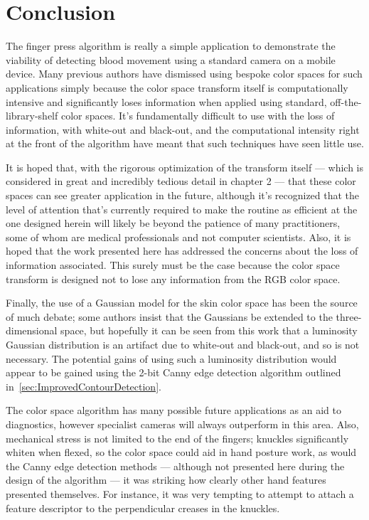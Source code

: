 \section{Conclusion}\label{sec:ConclusionCh5}

The finger press algorithm is really a simple application to demonstrate the viability of detecting blood movement using a standard camera on a mobile device. Many previous authors have dismissed using bespoke color spaces for such applications simply because the color space transform itself is computationally intensive and significantly loses information when applied using standard, off-the-library-shelf color spaces. It's fundamentally difficult to use with the loss of information, with white-out and black-out, and the computational intensity right at the front of the algorithm have meant that such techniques have seen little use.

It is hoped that, with the rigorous optimization of the transform itself --- which is considered in great and incredibly tedious detail in chapter 2 --- that these color spaces can see greater application in the future, although it's recognized that the level of attention that's currently required to make the routine as efficient at the one designed herein will likely be beyond the patience of many practitioners, some of whom are medical professionals and not computer scientists. Also, it is hoped that the work presented here has addressed the concerns about the loss of information associated. This surely must be the case because the color space transform is designed not to lose any information from the RGB color space.

Finally, the use of a Gaussian model for the skin color space has been the source of much debate; some authors insist that the Gaussians be extended to the three-dimensional space, but hopefully it can be seen from this work that a luminosity Gaussian distribution is an artifact due to white-out and black-out, and so is not necessary. The potential gains of using such a luminosity distribution would appear to be gained using the 2-bit Canny edge detection algorithm outlined in~\ref{sec:ImprovedContourDetection}.

The color space algorithm has many possible future applications as an aid to diagnostics, however specialist cameras will always outperform in this area. Also, mechanical stress is not limited to the end of the fingers; knuckles significantly whiten when flexed, so the color space could aid in hand posture work, as would the Canny edge detection methods --- although not presented here during the design of the algorithm --- it was striking how clearly other hand features presented themselves. For instance, it was very tempting to attempt to attach a feature descriptor to the perpendicular creases in the knuckles.

